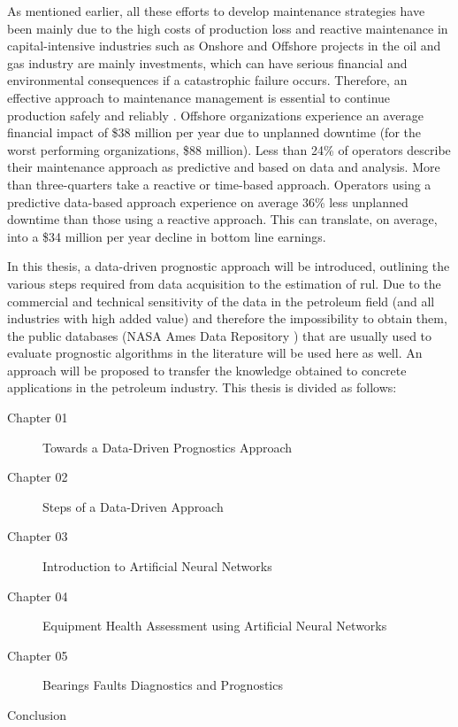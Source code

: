As mentioned earlier, all these efforts to develop maintenance strategies have been mainly due to the high costs of production loss and reactive maintenance in capital-intensive industries such as Onshore and Offshore projects in the oil and gas industry are mainly investments, which can have serious financial and environmental consequences if a catastrophic failure occurs. Therefore, an effective approach to maintenance management is essential to continue production safely and reliably \cite{Telford2011}. Offshore organizations experience an average financial impact of \$38 million per year due to unplanned downtime (for the worst performing organizations, \$88 million). Less than 24\% of operators describe their maintenance approach as predictive and based on data and analysis. More than three-quarters take a reactive or time-based approach. Operators using a predictive data-based approach experience on average 36\% less unplanned downtime than those using a reactive approach. This can translate, on average, into a \$34 million per year decline in bottom line earnings\cite{Eriksen2016}.

In this thesis, a data-driven prognostic approach will be introduced, outlining the various steps required from data acquisition to the estimation of \acrshort{rul}. Due to the commercial and technical sensitivity of the data in the petroleum field (and all industries with high added value) and therefore the impossibility to obtain them, the public databases (NASA Ames Data Repository \cite{NASAAAmes}) that are usually used to evaluate prognostic algorithms in the literature will be used here as well. An approach will be proposed to transfer the knowledge obtained to concrete applications in the petroleum industry.
\newline
This thesis is divided as follows:
\begin{description}
	\item [Chapter 01] Towards a Data-Driven Prognostics Approach
	\item [Chapter 02] Steps of a Data-Driven Approach
	\item [Chapter 03] Introduction to Artificial Neural Networks
	\item [Chapter 04] Equipment Health Assessment using Artificial Neural Networks
	\item [Chapter 05] Bearings Faults Diagnostics and Prognostics
	\item [Conclusion] 
\end{description}

